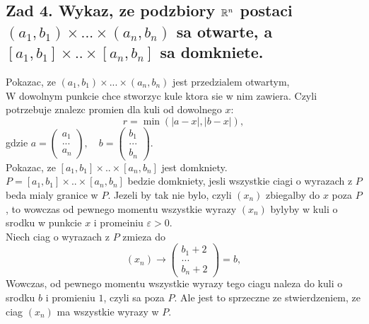 \documentclass{article}
\begin{document}
\subsection*{Zad 4. Wykaz, ze podzbiory $\mathbb{R}^n$ postaci $(a_1,b_1)\times...\times(a_n,b_n)$ sa otwarte, a $[a_1,b_1]\times..\times [a_n,b_n]$ sa domkniete.}
    Pokazac, ze $(a_1,b_1)\times...\times(a_n,b_n)$ jest przedzialem otwartym,\smallskip\\
    W dowolnym punkcie chce stworzyc kule ktora sie w nim zawiera. Czyli potrzebuje znalezc promien dla kuli od dowolnego $x$:
        $$r=\min(|a-x|,|b-x|),$$
    gdzie $a=\begin{pmatrix}a_1\\...\\a_n\end{pmatrix},\quad b=\begin{pmatrix}b_1\\...\\b_n\end{pmatrix}$.\medskip\\
    Pokazac, ze $[a_1,b_1]\times..\times [a_n,b_n]$ jest domkniety.\smallskip\\
    $P=[a_1,b_1]\times..\times [a_n,b_n]$ bedzie domkniety, jesli wszystkie ciagi o wyrazach z $P$ beda mialy granice w $P$. Jezeli by tak nie bylo, czyli $(x_n)$ zbiegalby do $x$ poza $P$, to wowczas od pewnego momentu wszystkie wyrazy $(x_n)$ bylyby w kuli o srodku w punkcie $x$ i promeiniu $\varepsilon>0$. \smallskip\\
    Niech ciag o wyrazach z $P$ zmieza do
        $$(x_n)\to \begin{pmatrix}b_1+2\\...\\b_n+2\end{pmatrix}=b,$$
    Wowczas, od pewnego momentu wszystkie wyrazy tego ciagu naleza do kuli o srodku $b$ i promieniu $1$, czyli sa poza $P$. Ale jest to sprzeczne ze stwierdzeniem, ze ciag $(x_n)$ ma wszystkie wyrazy w $P$. 
\end{document}
